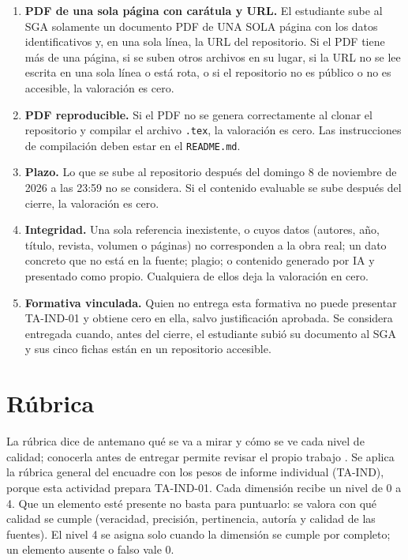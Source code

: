\documentclass[11pt,a4paper]{article}
\begin{document}
\begin{pisoBox}[title={Criterios de piso: su incumplimiento deja la valoración referencial en CERO}]
	\begin{enumerate}[label=\textbf{P\arabic*.},leftmargin=2.2em]
		\item \textbf{PDF de una sola página con carátula y URL.} El estudiante sube al SGA solamente un documento PDF de UNA SOLA página con los datos identificativos y, en una sola línea, la URL del repositorio. Si el PDF tiene más de una página, si se suben otros archivos en su lugar, si la URL no se lee escrita en una sola línea o está rota, o si el repositorio no es público o no es accesible, la valoración es cero.
		\item \textbf{PDF reproducible.} Si el PDF no se genera correctamente al clonar el repositorio y compilar el archivo \texttt{.tex}, la valoración es cero. Las instrucciones de compilación deben estar en el \texttt{README.md}.
		\item \textbf{Plazo.} Lo que se sube al repositorio después del domingo 8 de noviembre de 2026 a las 23:59 no se considera. Si el contenido evaluable se sube después del cierre, la valoración es cero.
		\item \textbf{Integridad.} Una sola referencia inexistente, o cuyos datos (autores, año, título, revista, volumen o páginas) no corresponden a la obra real; un dato concreto que no está en la fuente; plagio; o contenido generado por IA y presentado como propio. Cualquiera de ellos deja la valoración en cero.
		\item \textbf{Formativa vinculada.} Quien no entrega esta formativa no puede presentar TA-IND-01 y obtiene cero en ella, salvo justificación aprobada. Se considera entregada cuando, antes del cierre, el estudiante subió su documento al SGA y sus cinco fichas están en un repositorio accesible.
	\end{enumerate}
\end{pisoBox}

\section{Rúbrica}

La rúbrica dice de antemano qué se va a mirar y cómo se ve cada nivel de calidad; conocerla antes de entregar permite revisar el propio trabajo \cite{brookhart2018appropriate,panadero2020critical}. Se aplica la rúbrica general del encuadre con los pesos de informe individual (TA-IND), porque esta actividad prepara TA-IND-01. Cada dimensión recibe un nivel de 0 a 4. Que un elemento esté presente no basta para puntuarlo: se valora con qué calidad se cumple (veracidad, precisión, pertinencia, autoría y calidad de las fuentes). El nivel 4 se asigna solo cuando la dimensión se cumple por completo; un elemento ausente o falso vale 0.
\end{document}
